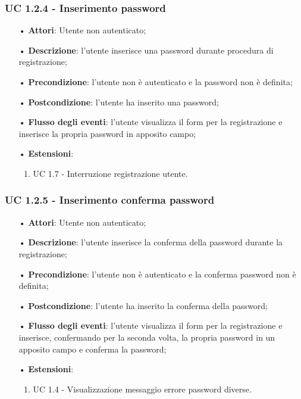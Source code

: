 \subsubsection{UC 1.2.4 - Inserimento password}
\begin{itemize}
	\item[•]\textbf{Attori}: Utente non autenticato;
	\item[•]\textbf{Descrizione}: l'utente inserisce una password durante procedura di registrazione;
	\item[•]\textbf{Precondizione}: l'utente non è autenticato e la password non è definita;
	\item[•]\textbf{Postcondizione}: l'utente ha inserito una password;
	\item[•]\textbf{Flusso degli eventi}: l'utente visualizza il form per la registrazione e inserisce la propria password in apposito campo;
	\item[•]\textbf{Estensioni}:
	\begin{enumerate}
		\item UC 1.7 - Interruzione registrazione utente.
	\end{enumerate}
\end{itemize}

\subsubsection{UC 1.2.5 - Inserimento conferma password}
\begin{itemize}
	\item[•]\textbf{Attori}: Utente non autenticato;
	\item[•]\textbf{Descrizione}: l'utente inserisce la conferma della password durante la registrazione;
	\item[•]\textbf{Precondizione}: l'utente non è autenticato e la conferma password non è definita;
	\item[•]\textbf{Postcondizione}: l'utente ha inserito la conferma della password;
	\item[•]\textbf{Flusso degli eventi}: l'utente visualizza il form per la registrazione e inserisce, confermando per la seconda volta, la propria password in un apposito campo e conferma la password;
	\item[•] \textbf{Estensioni}:
		\begin{enumerate}
		\item UC 1.4 - Visualizzazione messaggio errore password diverse.
	\end{enumerate}
\end{itemize}

